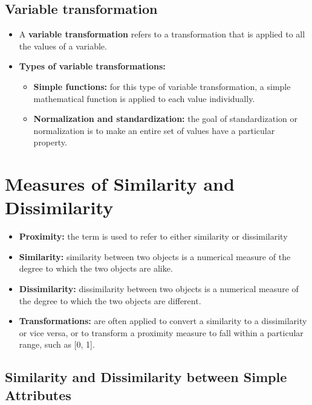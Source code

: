 	\subsection*{Variable transformation}
		\begin{itemize}
			\item A {\bf variable transformation} refers to a transformation that is applied to
			all the values of a variable. 
			\item{\bf Types of variable transformations:}
				\begin{itemize}
					\item{\bf Simple functions:} for this type of variable transformation, a 
					simple mathematical function is applied to each value individually. 
					\item{\bf Normalization and standardization:} the goal of standardization 
					or normalization is to make an entire set of values have a particular 
					property. 
				\end{itemize}
		\end{itemize}

\clearpage
\section{Measures of Similarity and Dissimilarity}

	\begin{itemize}
		\item {\bf Proximity:} the term is used to refer to either similarity or dissimilarity
		\item {\bf Similarity:} similarity between two objects is a numerical measure of the degree 
		to which the two objects are alike.
		\item{\bf Dissimilarity:} dissimilarity between two objects is a numerical measure of the 
		degree to which the two objects are different.
		\item {\bf Transformations:} are often applied to convert a similarity to a dissimilarity
		or vice versa, or to transform a proximity measure to fall within a particular range,
		such as [0, 1].
	\end{itemize}

	\subsection*{Similarity and Dissimilarity between Simple Attributes}


